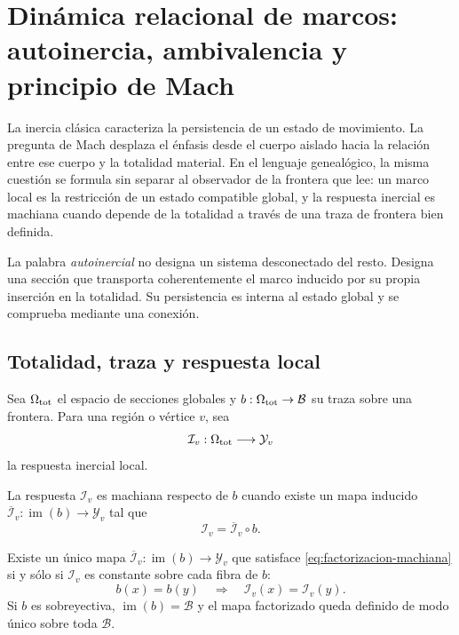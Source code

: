 \chapter{Dinámica relacional de marcos: autoinercia, ambivalencia y principio
de Mach}
\label{chap:autoinercia-mach}

La inercia clásica caracteriza la persistencia de un estado de movimiento.
La pregunta de Mach \cite{MachMechanics} desplaza el énfasis desde el cuerpo aislado hacia la
relación entre ese cuerpo y la totalidad material. En el lenguaje
genealógico, la misma cuestión se formula sin separar al observador de la
frontera que lee: un marco local es la restricción de un estado compatible
global, y la respuesta inercial es machiana cuando depende de la totalidad a
través de una traza de frontera bien definida.

La palabra \emph{autoinercial} no designa un sistema desconectado del resto.
Designa una sección que transporta coherentemente el marco inducido por su
propia inserción en la totalidad. Su persistencia es interna al estado global
y se comprueba mediante una conexión.

\section{Totalidad, traza y respuesta local}

Sea \(\Omega_{\rm tot}\) el espacio de secciones globales y
\(b:\Omega_{\rm tot}\to\mathcal B\) su traza sobre una frontera. Para una
región o vértice \(v\), sea
\[
 \mathcal I_v:\Omega_{\rm tot}\longrightarrow\mathcal Y_v
\]
la respuesta inercial local.

\begin{definition}
La respuesta \(\mathcal I_v\) es machiana respecto de \(b\) cuando existe
un mapa inducido
\(\overline{\mathcal I}_v:\operatorname{im}(b)\to\mathcal Y_v\) tal que
\begin{equation}
 \mathcal I_v=\overline{\mathcal I}_v\circ b.
 \label{eq:factorizacion-machiana}
\end{equation}
\end{definition}

\begin{theorem}
\label{thm:criterio-mach}
Existe un único mapa
\(\overline{\mathcal I}_v:\operatorname{im}(b)\to\mathcal Y_v\) que satisface
\eqref{eq:factorizacion-machiana} si y sólo si \(\mathcal I_v\) es constante
sobre cada fibra de \(b\):
\[
 b(x)=b(y)\quad\Longrightarrow\quad
 \mathcal I_v(x)=\mathcal I_v(y).
\]
Si \(b\) es sobreyectiva, \(\operatorname{im}(b)=\mathcal B\) y el mapa
factorizado queda definido de modo único sobre toda \(\mathcal B\).
\end{theorem}

